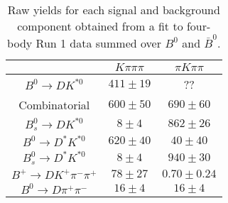 \begin{table}
  \centering
  \begin{tabular}{ccc}
      \toprule
       & $K\pi\pi\pi$ & $\pi K\pi\pi$ \\
      \midrule
      $B^0 \to DK^{*0}$ & $411 \pm 19$ & ?? \\
      Combinatorial & $600 \pm 50$ & $690 \pm 60$ \\
      $B^0_s \to DK^{*0}$ & $8 \pm 4$ & $862 \pm 26$ \\
      $B^0 \to D^*K^{*0}$ & $620 \pm 40$ & $40 \pm 40$ \\
      $B^0_s \to D^*K^{*0}$ & $8 \pm 4$ & $940 \pm 30$ \\
      $B^+ \to DK^+\pi^-\pi^+$ & $78 \pm 27$ & $0.70 \pm 0.24$ \\
      $B^0 \to D\pi^+\pi^-$ & $16 \pm 4$ & $16 \pm 4$ \\
      \bottomrule
      \end{tabular}
  \caption{Raw yields for each signal and background component obtained from a fit to four-body Run 1 data summed over $B^0$ and $\bar{B}^0$.}
\label{tab:yields_combined_4body_run1}
\end{table}
